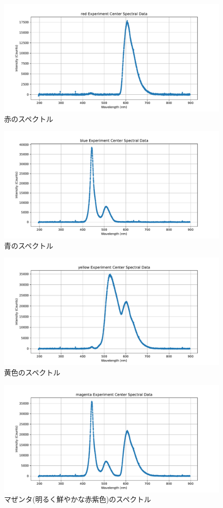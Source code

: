\documentclass[a4j,twocolumn]{jsarticle}
\begin{document}
\begin{figure}[htb]
    \centering
    \includegraphics[keepaspectratio,width=0.6\columnwidth]{fig/red.pdf}
    \caption{赤のスペクトル}
\end{figure}
\begin{figure}[htb]
    \centering
    \includegraphics[keepaspectratio,width=0.6\columnwidth]{fig/blue.pdf}
    \caption{青のスペクトル}
\end{figure}
\begin{figure}[htb]
    \centering
    \includegraphics[keepaspectratio,width=0.6\columnwidth]{fig/yellow.pdf}
    \caption{黄色のスペクトル}
\end{figure}
\begin{figure}[htb]
    \centering
    \includegraphics[keepaspectratio,width=0.6\columnwidth]{fig/magenta.pdf}
    \caption{マぜンタ(明るく鮮やかな赤紫色)のスペクトル}
\end{figure}
\end{document}

